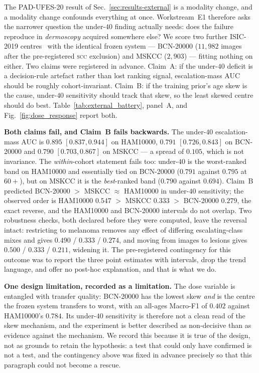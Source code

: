 \documentclass[journal]{IEEEtran}
\begin{document}
The PAD-UFES-20 result of Sec.~\ref{sec:results-external} is a modality change, and a
modality change confounds everything at once. Workstream~E1 therefore asks the narrower
question the under-$40$ finding actually needs: does the failure reproduce in
\emph{dermoscopy} acquired somewhere else? We score two further ISIC-2019
centres~\cite{combalia2019bcn20000, codella2018isic} with the identical frozen system ---
BCN-20000 ($11{,}982$ images after the pre-registered \textsc{scc} exclusion) and MSKCC
($2{,}903$) --- fitting nothing on either. Two claims were registered in advance. Claim~A: if
the under-$40$ deficit is a decision-rule artefact rather than lost ranking signal,
escalation-mass AUC should be roughly cohort-invariant. Claim~B: if the training prior's age
skew is the cause, under-$40$ sensitivity should track that skew, so the least skewed centre
should do best. Table~\ref{tab:external_battery}, panel~A, and Fig.~\ref{fig:dose_response}
report both.

\textbf{Both claims fail, and Claim~B fails backwards.} The under-$40$ escalation-mass AUC is
$0.895$ $[0.837, 0.944]$ on HAM10000, $0.791$ $[0.726, 0.843]$ on BCN-20000 and $0.790$
$[0.703, 0.867]$ on MSKCC --- a spread of $0.105$, which is not invariance. The
\emph{within}-cohort statement fails too: under-$40$ is the worst-ranked band on HAM10000 and
essentially tied on BCN-20000 ($0.791$ against $0.795$ at $60+$), but on MSKCC it is the
\emph{best}-ranked band ($0.790$ against $0.694$). Claim~B predicted
BCN-20000 $>$ MSKCC $\approx$ HAM10000 in under-$40$ sensitivity; the observed order is
HAM10000 $0.547$ $>$ MSKCC $0.333$ $>$ BCN-20000 $0.279$, the exact reverse, and the
HAM10000 and BCN-20000 intervals do not overlap. Two robustness checks, both declared before
they were computed, leave the reversal intact: restricting to melanoma removes any effect of
differing escalating-class mixes and gives $0.490$ / $0.333$ / $0.274$, and moving from
images to lesions gives $0.500$ / $0.333$ / $0.211$, widening it. The pre-registered
contingency for this outcome was to report the three point estimates with intervals, drop the
trend language, and offer no post-hoc explanation, and that is what we do.

\textbf{One design limitation, recorded as a limitation.} The dose variable is entangled with
transfer quality: BCN-20000 has the lowest skew \emph{and} is the centre the frozen system
transfers to worst, with an all-ages Macro-F1 of $0.402$ against HAM10000's $0.784$. Its
under-$40$ sensitivity is therefore not a clean read of the skew mechanism, and the experiment
is better described as non-decisive than as evidence against the mechanism. We record this
because it is true of the design, not as grounds to retain the hypothesis: a test that could
only have confirmed is not a test, and the contingency above was fixed in advance precisely
so that this paragraph could not become a rescue.
\end{document}
